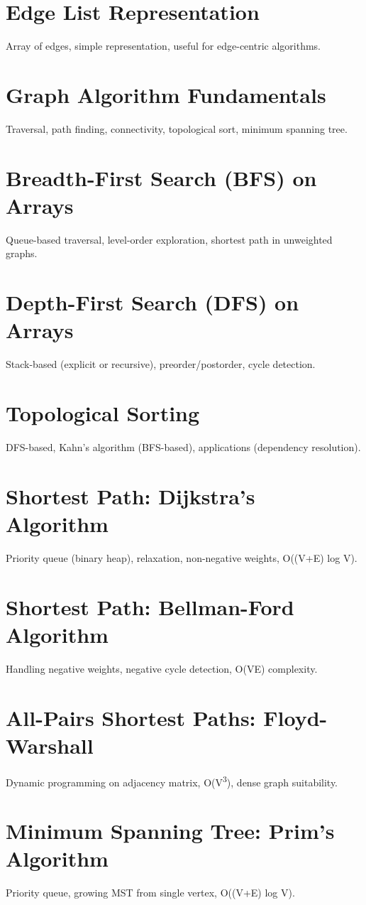 \chapter{Edge List Representation}
Array of edges, simple representation, useful for edge-centric algorithms.

\chapter{Graph Algorithm Fundamentals}
Traversal, path finding, connectivity, topological sort, minimum spanning tree.

\chapter{Breadth-First Search (BFS) on Arrays}
Queue-based traversal, level-order exploration, shortest path in unweighted graphs.

\chapter{Depth-First Search (DFS) on Arrays}
Stack-based (explicit or recursive), preorder/postorder, cycle detection.

\chapter{Topological Sorting}
DFS-based, Kahn's algorithm (BFS-based), applications (dependency resolution).

\chapter{Shortest Path: Dijkstra's Algorithm}
Priority queue (binary heap), relaxation, non-negative weights, O((V+E) log V).

\chapter{Shortest Path: Bellman-Ford Algorithm}
Handling negative weights, negative cycle detection, O(VE) complexity.

\chapter{All-Pairs Shortest Paths: Floyd-Warshall}
Dynamic programming on adjacency matrix, O(V\textsuperscript{3}), dense graph suitability.

\chapter{Minimum Spanning Tree: Prim's Algorithm}
Priority queue, growing MST from single vertex, O((V+E) log V).

